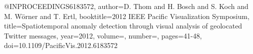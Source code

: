 @INPROCEEDINGS{6183572,
  author={D. {Thom} and H. {Bosch} and S. {Koch} and M. {Wörner} and T. {Ertl}},
  booktitle={2012 IEEE Pacific Visualization Symposium}, 
  title={Spatiotemporal anomaly detection through visual analysis of geolocated Twitter messages}, 
  year={2012},
  volume={},
  number={},
  pages={41-48},
  doi={10.1109/PacificVis.2012.6183572}}